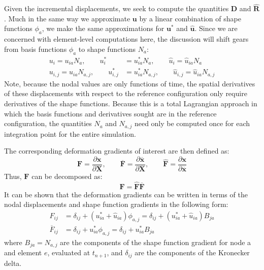 Given the incremental displacements, we seek to compute the quantities $\bm{D}$ and $\hat{\bm{R}}$. Much in the same way we approximate $\bm{u}$ by a linear combination of shape functions $\phi_a$, we make the same approximations for $\bm{u}^*$ and $\hat{\bm{u}}$. Since we are concerned with element-level computations here, the discussion will shift gears from basis functions $\phi_a$ to shape functions $N_a$:
\begin{align}
u_i = u_{ia}N_a, \qquad u^*_i &= u^*_{ia}N_a, \qquad \hat{u}_i = \hat{u}_{ia}N_a \\
u_{i,j} = u_{ia}N_{a,j}, \qquad u^*_{i,j} &= u^*_{ia}N_{a,j}, \qquad \hat{u}_{i,j} = \hat{u}_{ia}N_{a,j}
\end{align}
Note, because the nodal values are only functions of time, the spatial derivatives of these displacements with respect to the reference configuration only require derivatives of the shape functions. Because this is a total Lagrangian approach in which the basis functions and derivatives sought are in the reference configuration, the quantities $N_a$ and $N_{a,j}$ need only be computed once for each integration point for the entire simulation.

The corresponding deformation gradients of interest are then defined as:
\begin{equation}
\bm{F} = \frac{\partial \bm{x}}{\partial \bm{X}}, \qquad \bm{\overline{F}} = \frac{\partial \bm{\overline{x}}}{\partial \bm{X}}, \qquad \hat{\bm{F}} = \frac{\partial \bm{x}}{\partial \bm{\overline{x}}}
\end{equation}
Thus, $\bm{F}$ can be decomposed as:
\begin{equation}
\bm{F} = \hat{\bm{F}}\bm{\overline{F}}
\end{equation}
It can be shown that the deformation gradients can be written in terms of the nodal displacements and shape function gradients in the following form:
\begin{align}
F_{ij} &= \delta_{ij} + \left(u^*_{ia} + \hat{u}_{ia} \right) \phi_{a,j} = \delta_{ij} + \left(u^*_{ia} + \hat{u}_{ia} \right) B_{ja} \\
\overline{F}_{ij} &= \delta_{ij} + u^*_{ia} \phi_{a,j} = \delta_{ij} + u^*_{ia} B_{ja}
\end{align}
where $B_{ja} = N_{a,j}$ are the components of the shape function gradient for node a and element $e$, evaluated at $t_{n+1}$, and $\delta_{ij}$ are the components of the Kronecker delta.

